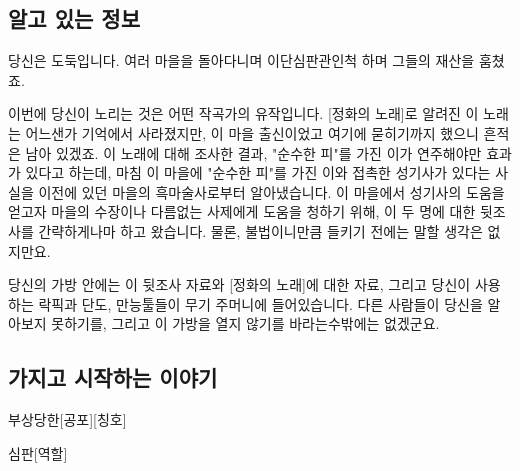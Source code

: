 \documentclass{report}
\begin{document}
	\subsection*{알고 있는 정보}
		당신은 도둑입니다. 여러 마을을 돌아다니며 이단심판관인척 하며 그들의 재산을 훔쳤죠.
		
		이번에 당신이 노리는 것은 어떤 작곡가의 유작입니다. [정화의 노래]로 알려진 이 노래는 어느샌가 기억에서 사라졌지만, 이 마을 출신이었고 여기에 묻히기까지 했으니 흔적은 남아 있겠죠. 이 노래에 대해 조사한 결과, "순수한 피"를 가진 이가 연주해야만 효과가 있다고 하는데, 마침 이 마을에 "순수한 피"를 가진 이와 접촉한 성기사가 있다는 사실을 이전에 있던 마을의 흑마술사로부터 알아냈습니다. 이 마을에서 성기사의 도움을 얻고자 마을의 수장이나 다름없는 사제에게 도움을 청하기 위해, 이 두 명에 대한 뒷조사를 간략하게나마 하고 왔습니다. 물론, 불법이니만큼 들키기 전에는 말할 생각은 없지만요.
		
		당신의 가방 안에는 이 뒷조사 자료와 [정화의 노래]에 대한 자료, 그리고 당신이 사용하는 락픽과 단도, 만능툴들이 무기 주머니에 들어있습니다. 다른 사람들이 당신을 알아보지 못하기를, 그리고 이 가방을 열지 않기를 바라는수밖에는 없겠군요.
	
	\subsection*{가지고 시작하는 이야기}
		\begin{spoiler}{부상당한}{[공포][칭호]}
			
		\end{spoiler}
		
		\begin{spoiler}{심판}{[역할]}
			
		\end{spoiler}
	
\end{document}
